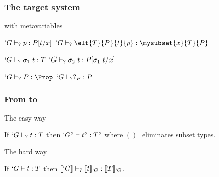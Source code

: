 \begin{frame}
  \frametitle{The target system}
  
  \begin{block}{\CIC{} with metavariables}
    \begin{center}
      {$`G \vdash_{?} p : P[t/x]$}
      {$`G \typec \elt{T}{P}{t}{p} : \mysubset{x}{T}{P}$}
      {}\DP
      
      \vspace{0.25cm}
      {$`G \vdash_{?} \sigma_1~t : T$}
      {}
      \DP
      \quad
      {$`G \vdash_{?} \sigma_2~t : P[\sigma_1~t/x]$}
      {}
      \DP

      \vspace{0.25cm}
      \UAX{}
      {$`G \typec P : \Prop$}
      {$`G \vdash_{?} ?_{P} : P$}
      {}\DP
    \end{center}
  \end{block}
    
\end{frame}
\begin{frame}
  \frametitle{From \Coq to \lng{}}
  \begin{block}{The easy way}

    If $`G \vdash_{?} t : T$ then $`G^{\circ} \vdash t^{\circ} : T^{\circ}$ where
    $()^{\circ}$ eliminates subset types.
  \end{block}
  \pause
  \begin{block}{The hard way}
    \begin{center}
      If $`G \vdash t : T$ then $\llbracket `G \rrbracket \vdash_{?} \llbracket t \rrbracket_{`G} : \llbracket T \rrbracket_{`G}$.
    \end{center}
  \end{block}
\end{frame}

